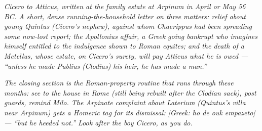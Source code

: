 
\textit{Cicero to Atticus, written at the family estate at
Arpinum in April or May 56 BC. A short, dense
running-the-household letter on three matters: relief about
young Quintus (Cicero's nephew), against whom Chaerippus had
been spreading some now-lost report; the Apollonius affair, a
Greek going bankrupt who imagines himself entitled to the
indulgence shown to Roman \textit{equites}; and the death of
a Metellus, whose estate, on Cicero's surety, will pay
Atticus what he is owed --- ``unless he made Publius (Clodius)
his heir, he has made a man.''}

\textit{The closing section is the Roman-property routine that
runs through these months: see to the house in Rome (still
being rebuilt after the Clodian sack), post guards, remind
Milo. The Arpinate complaint about Laterium (Quintus's villa
near Arpinum) gets a Homeric tag for its dismissal:
\textit{[Greek: ho de ouk empazeto]} --- ``but he heeded
not.'' Look after the boy Cicero, as you do.}
